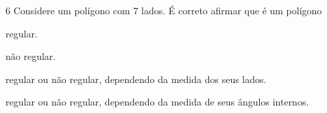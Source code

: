 





\num{6} Considere um polígono com 7 lados. É correto afirmar que é um polígono

\begin{escolha}
\item regular.
\item não regular.
\item regular ou não regular, dependendo da medida dos seus
lados.
\item regular ou não regular, dependendo da medida de seus
ângulos internos.
\end{escolha}







